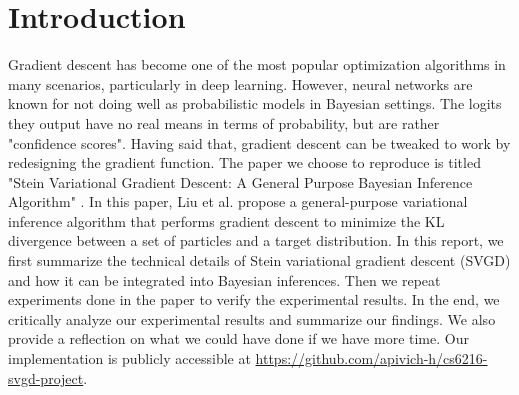 \section{Introduction}
Gradient descent has become one of the most popular optimization algorithms in many scenarios, particularly in deep learning. However, neural networks are known for not doing well as probabilistic models in Bayesian settings. The logits they output have no real means in terms of probability, but are rather "confidence scores". Having said that, gradient descent can be tweaked to work by redesigning the gradient function. The paper we choose to reproduce is titled "Stein Variational Gradient Descent: A General Purpose Bayesian Inference Algorithm" \cite{ref_article_svgd}. In this paper, Liu et al. propose a general-purpose variational inference algorithm that performs gradient descent to minimize the KL divergence between a set of particles and a target distribution. In this report, we first summarize the technical details of Stein variational gradient descent (SVGD) and how it can be integrated into Bayesian inferences. Then we repeat experiments done in the paper to verify the experimental results. In the end, we critically analyze our experimental results and summarize our findings. We also provide a reflection on what we could have done if we have more time. Our implementation is publicly accessible at \url{https://github.com/apivich-h/cs6216-svgd-project}.